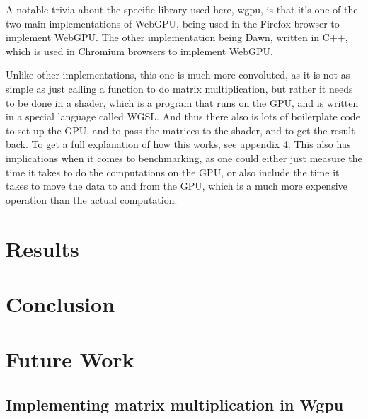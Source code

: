 \documentclass{article}
\begin{document}
A notable trivia about the specific library used here, wgpu, is that it's one of the two main implementations of WebGPU, being used in the Firefox browser to implement WebGPU.
The other implementation being Dawn, written in C++, which is used in Chromium browsers to implement WebGPU.

Unlike other implementations, this one is much more convoluted, as it is not as simple as just calling a function to do matrix multiplication,
but rather it needs to be done in a shader, which is a program that runs on the GPU, and is written in a special language called WGSL.
And thus there also is lots of boilerplate code to set up the GPU, and to pass the matrices to the shader, and to get the result back.
To get a full explanation of how this works, see appendix \ref{sec:wgpu}.
This also has implications when it comes to benchmarking, as one could either just measure the time it takes to do the computations on the GPU,
or also include the time it takes to move the data to and from the GPU, which is a much more expensive operation than the actual computation.

\section{Results}

\section{Conclusion}

\section{Future Work}

\begin{appendices}

\appendix

\section{Implementing matrix multiplication in Wgpu}

 \label{sec:wgpu}


\end{appendices}
\end{document}
